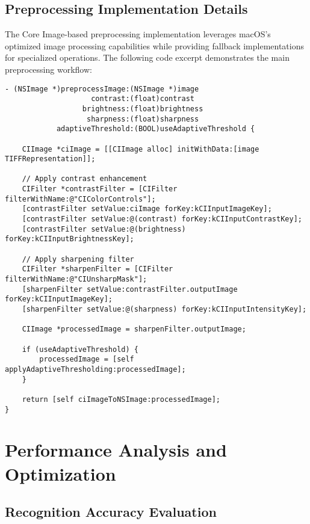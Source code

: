 \begin{table}[H]
\begin{table}[H]
\subsection{Preprocessing Implementation Details}

The Core Image-based preprocessing implementation leverages macOS's optimized image processing capabilities while providing fallback implementations for specialized operations. The following code excerpt demonstrates the main preprocessing workflow:

\begin{verbatim}
- (NSImage *)preprocessImage:(NSImage *)image 
                    contrast:(float)contrast 
                  brightness:(float)brightness 
                   sharpness:(float)sharpness 
            adaptiveThreshold:(BOOL)useAdaptiveThreshold {
    
    CIImage *ciImage = [[CIImage alloc] initWithData:[image TIFFRepresentation]];
    
    // Apply contrast enhancement
    CIFilter *contrastFilter = [CIFilter filterWithName:@"CIColorControls"];
    [contrastFilter setValue:ciImage forKey:kCIInputImageKey];
    [contrastFilter setValue:@(contrast) forKey:kCIInputContrastKey];
    [contrastFilter setValue:@(brightness) forKey:kCIInputBrightnessKey];
    
    // Apply sharpening filter
    CIFilter *sharpenFilter = [CIFilter filterWithName:@"CIUnsharpMask"];
    [sharpenFilter setValue:contrastFilter.outputImage forKey:kCIInputImageKey];
    [sharpenFilter setValue:@(sharpness) forKey:kCIInputIntensityKey];
    
    CIImage *processedImage = sharpenFilter.outputImage;
    
    if (useAdaptiveThreshold) {
        processedImage = [self applyAdaptiveThresholding:processedImage];
    }
    
    return [self ciImageToNSImage:processedImage];
}
\end{verbatim}


\section{Performance Analysis and Optimization}

\subsection{Recognition Accuracy Evaluation}


\end{table}
\end{table}
